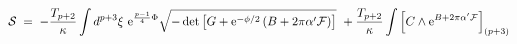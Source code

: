 \begin{equation}
{\cal S} \;=\;  - \frac{T_{p+2}}{\kappa} \int d^{p+3} \xi  \,\,{\rm
e}^{\frac{p-1}{4} \Phi} \sqrt{- \det \left[ G +  {\rm e}^{- \phi/2}
\left(B + 2 \pi \alpha'  {\cal F}\right)\right]} \, \,+
\frac{T_{p+2}}{\kappa} \int \left[ C \wedge {\rm e}^{B + 2 \pi \alpha'
{\cal F}} \right]_{(p+3)}
\label{bp+2}
\end{equation}

